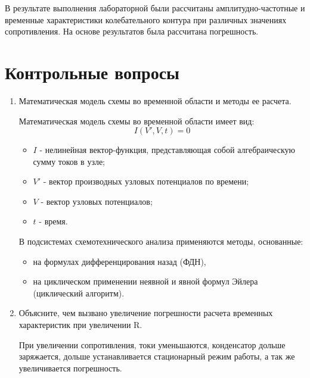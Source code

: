 \documentclass[a4paper,14pt]{article}
\begin{document}
В	результате выполнения лабораторной были рассчитаны амплитудно-частотные и временные характеристики колебательного контура при различных значениях сопротивления. На основе результатов была рассчитана погрешность.


\section{Контрольные вопросы}

\begin{enumerate}
	\item Математическая модель схемы во временной области и методы ее расчета.
	
	Математическая модель схемы во временной области имеет вид: 
	\begin{equation}
	I(V', V, t) = 0
	\end{equation}
	\begin{itemize}
		\item $I$ - нелинейная вектор-функция, представляющая собой алгебраическую сумму токов в узле;
		
		\item $V'$ - вектор производных узловых потенциалов по времени;
		
		\item $V$ - вектор узловых потенциалов;
		
		\item $t$ - время. 
	\end{itemize}


	В подсистемах схемотехнического анализа применяются методы, основанные:
	\begin{itemize}
		\item на формулах дифференцирования назад (ФДН),
		\item на циклическом применении неявной и явной формул Эйлера (циклический алгоритм). 
	\end{itemize}
	
	\item Объясните, чем вызвано увеличение погрешности расчета временных характеристик при увеличении R.
	
	При увеличении сопротивления, токи уменьшаются, конденсатор  дольше заряжается, дольше устанавливается стационарный режим работы, а так же увеличивается погрешность.
\end{enumerate}
\end{document}
